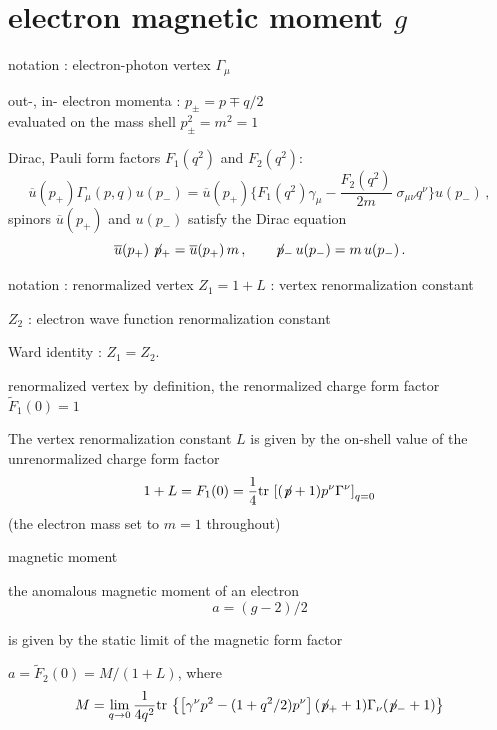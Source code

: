 \section[electron magnetic moment $g$]
{electron magnetic moment $g$}


\begin{frame}{notation : electron-photon vertex $\Gamma_{\mu}$}

out-, in- electron momenta : $p_{\pm}=p \mp q/2$
\\
evaluated on the mass shell $p_{\pm}^2=m^2 = 1$
\medskip

Dirac, Pauli form factors $F_1(q^2)$ and $F_2(q^2)$:
\[
\overline{u}(p_{+}) \Gamma_{\mu}(p,q) %
u(p_{-})
    =    %
\overline{u}(p_{+}) \Bigg\{ F_1(q^2) \gamma_{\mu} -
\frac{F_2 (q^2)}{2m} \; \sigma_{\mu \nu} q^{\nu} \Bigg\} u(p_{-}) \,,
\] %
spinors  $\overline{u}(p_{+})$ and $u(p_{-})$  satisfy the Dirac
equation
\[
\overline{u}(p_{+}) \not\!{p}_{+} = \overline{u}(p_{+})\,m
\,, \qquad
\not\!{p}_{-} \, u(p_{-})  =  m \, u(p_{-}) \,.
\]
\end{frame}

\begin{frame}{notation : renormalized vertex}
$Z_1=1+L$ : vertex renormalization constant

$Z_2$ : electron wave function renormalization constant

Ward identity %
 : $Z_1=Z_2$.


\end{frame}

\begin{frame}{renormalized vertex}
by definition, the renormalized charge
form factor $\tilde{F}_1(0) = 1$

\bigskip
The vertex renormalization constant $L$ is given by the
on-shell value of the unrenormalized charge form factor
\[ %
1+L = F_1(0)
    = \frac{1}{4}\tr\left[(\not\!{p}+1)p^{\nu}\Gamma^{\nu}\right]_{q=0}
\label{PRD10-74-III(2.3)}
\] %
(the electron mass set to $m = 1$ throughout)
\end{frame}

\begin{frame}{magnetic moment}
\begin{block}{the anomalous magnetic moment of an electron}
\[a = (g-2)/2\]
\end{block}
  is given by the static limit of the magnetic form factor

$a=\tilde{F}_2(0)=M/(1+L)$, where
\[ %
M = \lim_{q\to0}
\frac{1}{4q^2}
\tr\left\{
\left[\gamma^{\nu}p^2-(1+q^2/2)p^{\nu}\right]
(\not\!{p}_++1)\Gamma_{\nu}(\not\!{p}_-+1)
\right\}
\] %
\end{frame}

